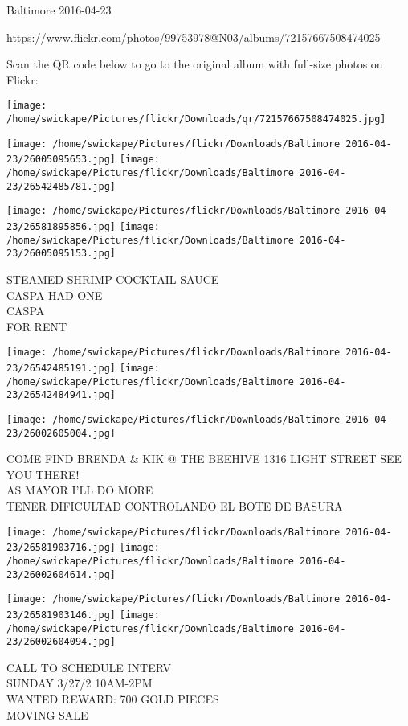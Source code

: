 \documentclass[10pt,letterpaper]{article}
\begin{document}
Baltimore 2016-04-23

https://www.flickr.com/photos/99753978@N03/albums/72157667508474025

Scan the QR code below to go to the original album with full-size photos on Flickr:

\texttt{[image: /home/swickape/Pictures/flickr/Downloads/qr/72157667508474025.jpg]}
\pagebreak

\texttt{[image: /home/swickape/Pictures/flickr/Downloads/Baltimore 2016-04-23/26005095653.jpg]}
\texttt{[image: /home/swickape/Pictures/flickr/Downloads/Baltimore 2016-04-23/26542485781.jpg]}

\texttt{[image: /home/swickape/Pictures/flickr/Downloads/Baltimore 2016-04-23/26581895856.jpg]}
\texttt{[image: /home/swickape/Pictures/flickr/Downloads/Baltimore 2016-04-23/26005095153.jpg]}

STEAMED SHRIMP COCKTAIL SAUCE\\
CASPA HAD ONE\\
CASPA\\
FOR RENT
\pagebreak

\texttt{[image: /home/swickape/Pictures/flickr/Downloads/Baltimore 2016-04-23/26542485191.jpg]}
\texttt{[image: /home/swickape/Pictures/flickr/Downloads/Baltimore 2016-04-23/26542484941.jpg]}

\vspace{0.25in}
\texttt{[image: /home/swickape/Pictures/flickr/Downloads/Baltimore 2016-04-23/26002605004.jpg]}

COME FIND BRENDA \& KIK @ THE BEEHIVE 1316 LIGHT STREET SEE YOU THERE!\\
AS MAYOR I'LL DO MORE\\
TENER DIFICULTAD CONTROLANDO EL BOTE DE BASURA
\pagebreak

\texttt{[image: /home/swickape/Pictures/flickr/Downloads/Baltimore 2016-04-23/26581903716.jpg]}
\texttt{[image: /home/swickape/Pictures/flickr/Downloads/Baltimore 2016-04-23/26002604614.jpg]}

\texttt{[image: /home/swickape/Pictures/flickr/Downloads/Baltimore 2016-04-23/26581903146.jpg]}
\texttt{[image: /home/swickape/Pictures/flickr/Downloads/Baltimore 2016-04-23/26002604094.jpg]}

CALL TO SCHEDULE INTERV\\
SUNDAY 3/27/2 10AM{-}2PM\\
WANTED REWARD: 700 GOLD PIECES\\
MOVING SALE
\pagebreak
\end{document}
